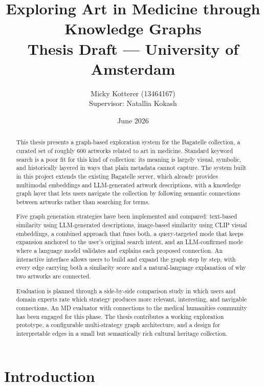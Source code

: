 \documentclass[12pt, a4paper]{article}
\title{%
    \Large\textbf{Exploring Art in Medicine through Knowledge Graphs}\\[0.5em]
    \large Thesis Draft --- University of Amsterdam
}
\author{Micky Kotterer (13464167)\\[0.3em]
    \small Supervisor: Natallia Kokash}
\date{June 2026}
\begin{document}
\maketitle
\thispagestyle{empty}
\begin{abstract}
\noindent
This thesis presents a graph-based exploration system for the Bagatelle collection, a curated set of
roughly 600 artworks related to art in medicine. Standard keyword search is a poor fit for this kind
of collection: its meaning is largely visual, symbolic, and historically layered in ways that plain
metadata cannot capture. The system built in this project extends the existing Bagatelle server,
which already provides multimodal embeddings and LLM-generated artwork descriptions, with a
knowledge graph layer that lets users navigate the collection by following semantic connections
between artworks rather than searching for terms.

Five graph generation strategies have been implemented and compared: text-based similarity using
LLM-generated descriptions, image-based similarity using CLIP visual embeddings, a combined
approach that fuses both, a query-targeted mode that keeps expansion anchored to the user's
original search intent, and an LLM-confirmed mode where a language model validates and explains
each proposed connection. An interactive interface allows users to build and expand the graph step
by step, with every edge carrying both a similarity score and a natural-language explanation of why
two artworks are connected.

Evaluation is planned through a side-by-side comparison study in which users and domain experts
rate which strategy produces more relevant, interesting, and navigable connections. An MD evaluator
with connections to the medical humanities community has been engaged for this phase. The thesis
contributes a working exploration prototype, a configurable multi-strategy graph architecture, and
a design for interpretable edges in a small but semantically rich cultural heritage collection.
\end{abstract}
\newpage
\tableofcontents
\newpage
\section{Introduction}
\end{document}
